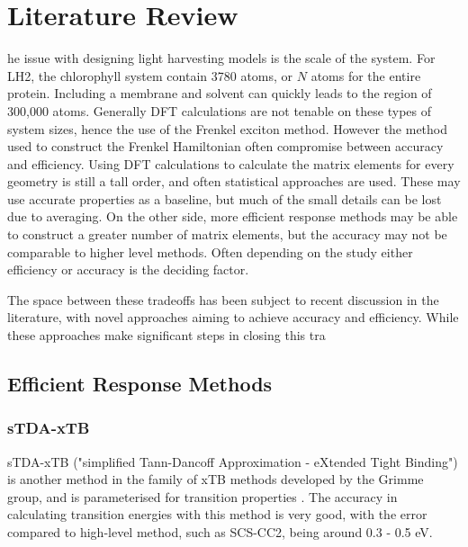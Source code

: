 %
%
\chapter{Literature Review}
\label{chap:lit_rev}

he issue with designing light harvesting models is the scale of the system.
For LH2, the chlorophyll system contain 3780 atoms, or $N$ atoms for the entire protein.
Including a membrane and solvent can quickly leads to the region of 300,000 atoms.
Generally DFT calculations are not tenable on these types of system sizes, hence 
the use of the Frenkel exciton method. However the method used to construct the 
Frenkel Hamiltonian often compromise between accuracy and efficiency. Using DFT
calculations to calculate the matrix elements for every geometry is still a tall
order, and often statistical approaches are used. These may use accurate properties
as a baseline, but much of the small details can be lost due to averaging. On the
other side, more efficient response methods may be able to construct a greater number
of matrix elements, but the accuracy may not be comparable to higher level methods.
Often depending on the study either efficiency or accuracy is the deciding factor.

The space between these tradeoffs has been subject to recent discussion in the literature,
with novel approaches aiming to achieve accuracy and efficiency. While these approaches
make significant steps in closing this tra

\section{Efficient Response Methods}
\label{sec:efficient_response_methods}

\subsection{sTDA-xTB}
\label{subsec:stda_xtb}
sTDA-xTB ("simplified Tann-Dancoff Approximation - eXtended Tight Binding") is another
method in the family of xTB methods developed by the Grimme group, and is parameterised
for transition properties \cite{Grimme2016}. The accuracy in calculating transition energies with this
method is very good, with the error compared to high-level method, such as SCS-CC2,
being around 0.3 - 0.5 eV.

